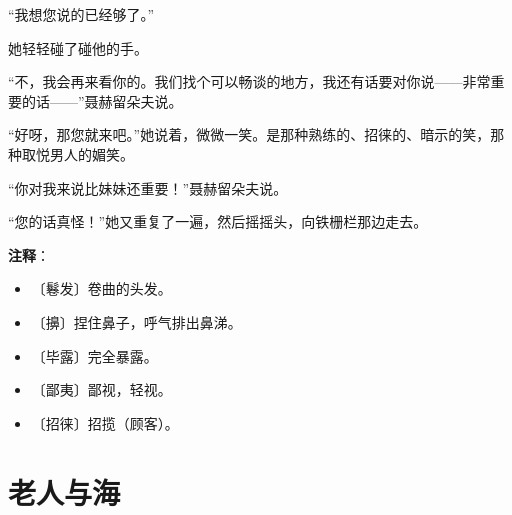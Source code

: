\documentclass[12pt,UTF-8,openany]{ctexbook}
\begin{document}
\begin{normalsize}
    “我想您说的已经够了。”
    
    她轻轻碰了碰他的手。
    
    “不，我会再来看你的。我们找个可以畅谈的地方，我还有话要对你说——非常重要的话——”聂赫留朵夫说。
    
    “好呀，那您就来吧。”她说着，微微一笑。是那种熟练的、招徕的、暗示的笑，那种取悦男人的媚笑。
    
    “你对我来说比妹妹还重要！”聂赫留朵夫说。
    
    “您的话真怪！”她又重复了一遍，然后摇摇头，向铁栅栏那边走去。
    
\end{normalsize}


\newpage

\textbf{注释}：

\vspace{-1em}

\begin{itemize}
    \setlength\itemsep{-0.2em}
    \item 〔鬈发〕卷曲的头发。
    \item 〔擤〕捏住鼻子，呼气排出鼻涕。
    \item 〔毕露〕完全暴露。
    \item 〔鄙夷〕鄙视，轻视。
    \item 〔招徕〕招揽（顾客）。
\end{itemize}

\chapter{老人与海}
\end{document}
